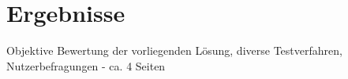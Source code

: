 \chapter{Ergebnisse}
\thispagestyle{fancy}

Objektive Bewertung der vorliegenden Lösung, diverse Testverfahren, Nutzerbefragungen - ca. 4 Seiten
